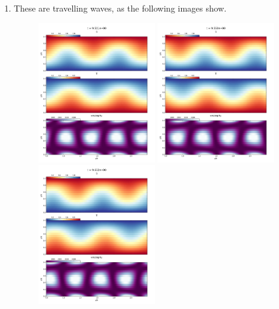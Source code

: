 \documentclass[10pt, preprint]{aastex}
\begin{document}
\begin{enumerate}
\item These are travelling waves, as the following images show.
\begin{figure}[!ht]
  \includegraphics[width=2in]{TS/snapshot_000184.png}
\endminipage\hfill
{}
  \includegraphics[width=2in]{TS/snapshot_000185.png}
\endminipage\hfill
{}
  \includegraphics[width=2in]{TS/snapshot_000186.png}
\endminipage\hfill
\end{figure}


\end{enumerate}
\end{document}
